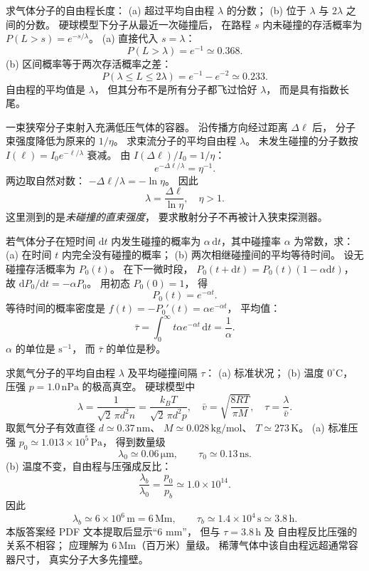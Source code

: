 求气体分子的自由程长度：
(a) 超过平均自由程 $\lambda$ 的分数；
(b) 位于 $\lambda$ 与 $2\lambda$ 之间的分数。
\exsolution
硬球模型下分子从最近一次碰撞后，
在路程 $s$ 内未碰撞的存活概率为
$P(L>s)=e^{-s/\lambda}$。
(a) 直接代入 $s=\lambda$：
\[
\boxed{P(L>\lambda)=e^{-1}\simeq0.368}.
\]
(b) 区间概率等于两次存活概率之差：
\[
\boxed{P(\lambda\le L\le2\lambda)
=e^{-1}-e^{-2}\simeq0.233}.
\]
\excheck 自由程的平均值是 $\lambda$，
但其分布不是所有分子都飞过恰好 $\lambda$，
而是具有指数长尾。

一束狭窄分子束射入充满低压气体的容器。
沿传播方向经过距离 $\Delta\ell$ 后，
分子束强度降低为原来的 $1/\eta$。
求束流分子的平均自由程 $\lambda$。
\exsolution
未发生碰撞的分子数按
$I(\ell)=I_0e^{-\ell/\lambda}$ 衰减。
由
$I(\Delta\ell)/I_0=1/\eta$：
\[
e^{-\Delta\ell/\lambda}=\eta^{-1}.
\]
两边取自然对数：
$-\Delta\ell/\lambda=-\ln\eta$。
因此
\[
\boxed{\lambda=\frac{\Delta\ell}{\ln\eta}},
\quad\eta>1.
\]
\excheck 这里测到的是\emph{未碰撞的直束强度}，
要求散射分子不再被计入狭束探测器。

若气体分子在短时间
$\mathrm dt$ 内发生碰撞的概率为
$\alpha\,\mathrm dt$，其中碰撞率
$\alpha$ 为常数，求：
(a) 在时间 $t$ 内完全没有碰撞的概率；
(b) 两次相继碰撞间的平均等待时间。
\exsolution
设无碰撞存活概率为 $P_0(t)$。
在下一微时段，
$P_0(t+\mathrm dt)=P_0(t)(1-\alpha\mathrm dt)$，
故
$\mathrm dP_0/\mathrm dt=-\alpha P_0$。
用初态 $P_0(0)=1$，
得
\[
\boxed{P_0(t)=e^{-\alpha t}}.
\]
等待时间的概率密度是
$f(t)=-P_0'(t)=\alpha e^{-\alpha t}$，
平均值：
\[
\boxed{\bar\tau=\int_0^\infty
t\alpha e^{-\alpha t}\,\mathrm dt=\frac1\alpha}.
\]
\excheck $\alpha$ 的单位是 $\mathrm{s^{-1}}$，
而 $\bar\tau$ 的单位是秒。

求氮气分子的平均自由程 $\lambda$
及平均碰撞间隔 $\tau$：
(a) 标准状况；
(b) 温度 $0^\circ\mathrm C$，
压强 $p=1.0\,\mathrm{nPa}$ 的极高真空。
\exsolution
硬球模型中
\[
\lambda=\frac1{\sqrt2\,\pi d^2n}
=\frac{k_BT}{\sqrt2\,\pi d^2p},
\quad
\bar v=\sqrt{\frac{8RT}{\pi M}},
\quad \tau=\frac\lambda{\bar v}.
\]
取氮气分子有效直径
$d\simeq0.37\,\mathrm{nm}$、
$M\simeq0.028\,\mathrm{kg/mol}$、
$T\simeq273\,\mathrm K$。
(a) 标准压强
$p_0\simeq1.013\times10^5\,\mathrm{Pa}$，
得到数量级
\[
\boxed{\lambda_0\simeq0.06\,\mathrm{\mu m}},
\qquad
\boxed{\tau_0\simeq0.13\,\mathrm{ns}}.
\]
(b) 温度不变，自由程与压强成反比：
\[
\frac{\lambda_b}{\lambda_0}=\frac{p_0}{p_b}
\simeq1.0\times10^{14}.
\]
因此
\[
\boxed{\lambda_b\simeq6\times10^6\,\mathrm m
=6\,\mathrm{Mm}},\qquad
\boxed{\tau_b\simeq1.4\times10^4\,\mathrm s
\simeq3.8\,\mathrm h}.
\]
\excheck 本版答案经 PDF 文本提取后显示“6 mm”，
但与 $\tau=3.8\,\mathrm h$ 及
自由程反比压强的关系不相容；
应理解为 $6\,\mathrm{Mm}$（百万米）量级。
稀薄气体中该自由程远超通常容器尺寸，
真实分子大多先撞壁。

